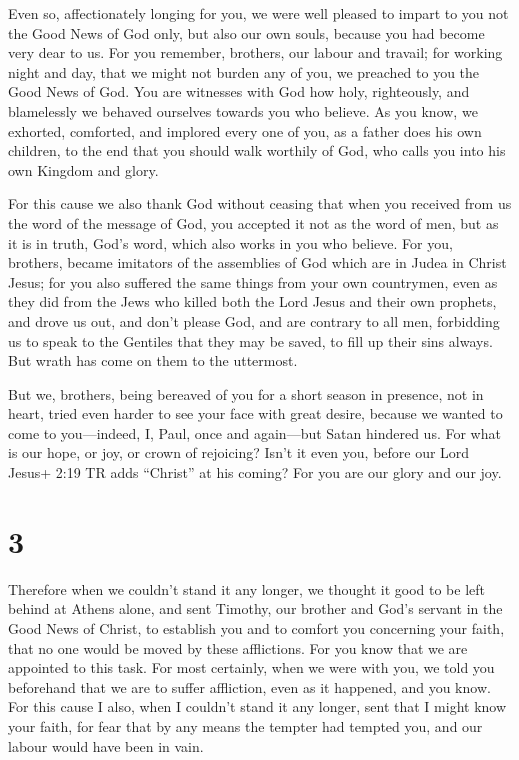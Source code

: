  Even so, affectionately longing for you, we were well
pleased to impart to you not the Good News of God only, but also our own
souls, because you had become very dear to us.  For you
remember, brothers, our labour and travail; for working night and day,
that we might not burden any of you, we preached to you the Good News of
God.  You are witnesses with God how holy, righteously, and
blamelessly we behaved ourselves towards you who believe. 
As you know, we exhorted, comforted, and implored every one of you, as a
father does his own children,  to the end that you should
walk worthily of God, who calls you into his own Kingdom and glory.

 For this cause we also thank God without ceasing that when
you received from us the word of the message of God, you accepted it not
as the word of men, but as it is in truth, God's word, which also works
in you who believe.  For you, brothers, became imitators of
the assemblies of God which are in Judea in Christ Jesus; for you also
suffered the same things from your own countrymen, even as they did from
the Jews  who killed both the Lord Jesus and their own
prophets, and drove us out, and don't please God, and are contrary to
all men,  forbidding us to speak to the Gentiles that they
may be saved, to fill up their sins always. But wrath has come on them
to the uttermost.

 But we, brothers, being bereaved of you for a short season
in presence, not in heart, tried even harder to see your face with great
desire,  because we wanted to come to you---indeed, I,
Paul, once and again---but Satan hindered us.  For what is
our hope, or joy, or crown of rejoicing? Isn't it even you, before our
Lord Jesus+ 2:19 TR adds ``Christ'' at his coming?  For you
are our glory and our joy.

\hypertarget{section-2}{%
\section{3}\label{section-2}}

 Therefore when we couldn't stand it any longer, we thought
it good to be left behind at Athens alone,  and sent
Timothy, our brother and God's servant in the Good News of Christ, to
establish you and to comfort you concerning your faith, 
that no one would be moved by these afflictions. For you know that we
are appointed to this task.  For most certainly, when we
were with you, we told you beforehand that we are to suffer affliction,
even as it happened, and you know.  For this cause I also,
when I couldn't stand it any longer, sent that I might know your faith,
for fear that by any means the tempter had tempted you, and our labour
would have been in vain.

